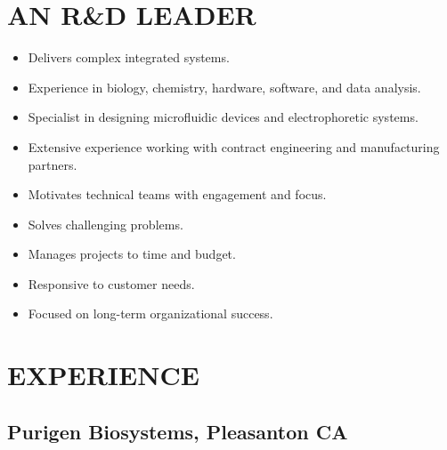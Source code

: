 \documentclass{res}
\begin{document}

\address{1125 Court Street \\ Alameda, CA 94538 \\ (650) 391-8463}

\address{Citizenship: United States \\ \\ lewis.a.marshall@gmail.com}

\begin{resume}

\section{AN R\&D LEADER}
  \begin{itemize}
    \item Delivers complex integrated systems.
    \item Experience in biology, chemistry, hardware, software, and data analysis.
    \item Specialist in designing microfluidic devices and electrophoretic systems.
    \item Extensive experience working with contract engineering and manufacturing partners.
    \item Motivates technical teams with engagement and focus.
    \item Solves challenging problems.
    \item Manages projects to time and budget.
    \item Responsive to customer needs.
    \item Focused on long-term organizational success.
  \end{itemize}



\section{EXPERIENCE}
\vspace{-0.1in}

   \subsection{Purigen Biosystems, Pleasanton CA}
    \vspace{-0.1in}


\end{resume}
\end{document}
